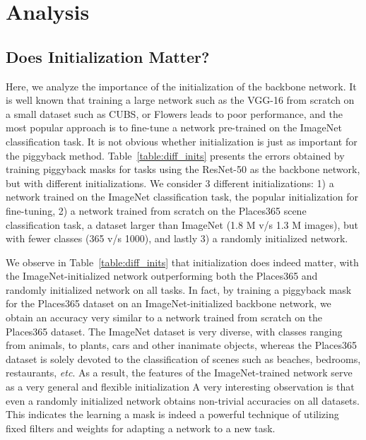 \documentclass{llncs}
\begin{document}
\section{Analysis}
\label{sec:analysis}

\subsection{Does Initialization Matter?}
\label{subsec:init_matter}
Here, we analyze the importance of the initialization of the backbone network. It is well known that training a large network such as the VGG-16 from scratch on a small dataset such as CUBS, or Flowers leads to poor performance, and the most popular approach is to fine-tune a network pre-trained on the ImageNet classification task. It is not obvious whether initialization is just as important for the piggyback method. Table~\ref{table:diff_inits} presents the errors obtained by training piggyback masks for tasks using the ResNet-50 as the backbone network, but with different initializations. We consider 3 different initializations: 1) a network trained on the ImageNet classification task, the popular initialization for fine-tuning, 2) a network trained from scratch on the Places365 scene classification task, a dataset larger than ImageNet (1.8 M v/s 1.3 M images), but with fewer classes (365 v/s 1000), and lastly 3) a randomly initialized network.

We observe in Table~\ref{table:diff_inits} that initialization does indeed matter, with the ImageNet-initialized network outperforming both the Places365 and randomly initialized network on all tasks. In fact, by training a piggyback mask for the Places365 dataset on an ImageNet-initialized backbone network, we obtain an accuracy very similar to a network trained from scratch on the Places365 dataset.
The ImageNet dataset is very diverse, with classes ranging from animals, to plants, cars and other inanimate objects, whereas the Places365 dataset is solely devoted to the classification of scenes such as beaches, bedrooms, restaurants, \emph{etc}. As a result, the features of the ImageNet-trained network serve as a very general and flexible initialization
A very interesting observation is that even a randomly initialized network obtains non-trivial accuracies on all datasets. This indicates the learning a mask is indeed a powerful technique of utilizing fixed filters and weights for adapting a network to a new task.
\end{document}
